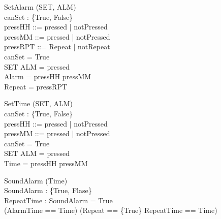\documentclass[Main_Assignment2]{subfiles}
\begin{document}
\begin{schema}{SetAlarm} %
\Delta (SET, ALM) \\
canSet : \{True, False\} \\
pressHH ::= pressed | notPressed \\
pressMM ::= pressed | notPressed \\
pressRPT ::= Repeat | notRepeat \\
\where
canSet = True \Rightarrow \\
\hspace{20pt} SET \wedge ALM = pressed \\
Alarm = pressHH \cup pressMM \\
Repeat = pressRPT
\end{schema}

\begin{schema}{SetTime} %
\Delta (SET, ALM) \\
canSet : \{True, False\} \\
pressHH ::= pressed | notPressed \\
pressMM ::= pressed | notPressed \\
\where
canSet = True \Rightarrow \\
\hspace{20pt} SET \wedge ALM = pressed \\
Time = pressHH \cup pressMM \\
\end{schema}

\begin{schema}{SoundAlarm}
\Delta (Time) \\
SoundAlarm : \{True, Flase\} \\
RepeatTime : 
\where
SoundAlarm = True \Rightarrow \\
\hspace{20pt} (AlarmTime == Time) \vee (Repeat == \{True\} \wedge RepeatTime == Time)
\end{schema}
\end{document}
